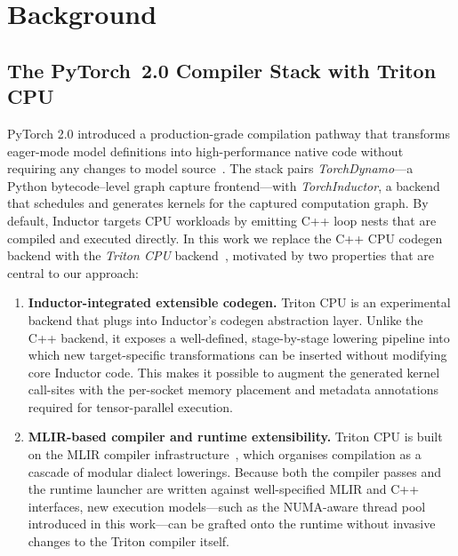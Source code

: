 \documentclass[conference]{IEEEtran}
\begin{document}
\section{Background}
\label{sec:background}

\subsection{The PyTorch~2.0 Compiler Stack with Triton CPU}
\label{sec:bg_pytorch}

PyTorch 2.0 introduced a production-grade compilation pathway that
transforms eager-mode model definitions into high-performance native
code without requiring any changes to model source~\cite{ansel2024pytorch2}.
The stack pairs \emph{TorchDynamo}—a Python bytecode–level graph
capture frontend—with \emph{TorchInductor}, a backend that schedules
and generates kernels for the captured computation graph.
By default, Inductor targets CPU workloads by emitting C++ loop nests
that are compiled and executed directly.
In this work we replace the C++ CPU codegen backend with the
\emph{Triton CPU} backend~\cite{tillet2019triton, triton_cpu_repo},
motivated by two properties that are central to our approach:

\begin{enumerate}[leftmargin=*, label=\arabic*., itemsep=2pt]

    \item \textbf{Inductor-integrated extensible codegen.}
          Triton CPU is an experimental backend that plugs into
          Inductor's codegen abstraction layer.  Unlike the C++ backend,
          it exposes a well-defined, stage-by-stage lowering pipeline
          into which new target-specific transformations can be inserted
          without modifying core Inductor code.  This makes it possible
          to augment the generated kernel call-sites with the per-socket
          memory placement and metadata annotations required for
          tensor-parallel execution.

    \item \textbf{MLIR-based compiler and runtime extensibility.}
          Triton CPU is built on the MLIR compiler
          infrastructure~\cite{lattner2021mlir}, which organises
          compilation as a cascade of modular dialect lowerings.
          Because both the compiler passes and the runtime launcher
          are written against well-specified MLIR and C++ interfaces,
          new execution models—such as the NUMA-aware thread pool
          introduced in this work—can be grafted onto the runtime
          without invasive changes to the Triton compiler itself.

\end{enumerate}
\end{document}
